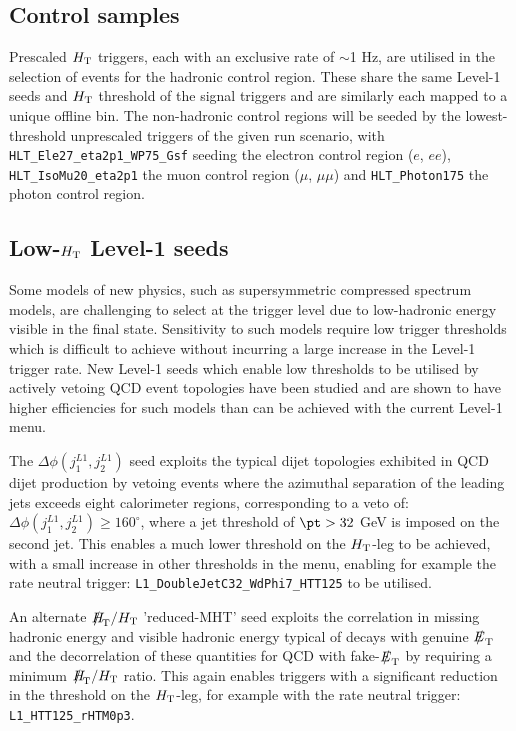\subsection{Control samples}
Prescaled $\mbox{$H_\text{T}$}$ triggers, each with an exclusive rate of $\sim$1 Hz, are utilised in the selection of events for the hadronic control region. These share the same Level-1 seeds and $\mbox{$H_\text{T}$}$ threshold of the signal triggers and are similarly each mapped to a unique offline bin. The non-hadronic control regions will be seeded by the lowest-threshold unprescaled triggers of the given run scenario, with \verb!HLT_Ele27_eta2p1_WP75_Gsf! seeding the electron control region ($e$, $ee$), \verb!HLT_IsoMu20_eta2p1! the muon control region ($\mu$, $\mu\mu$) and \verb!HLT_Photon175! the photon control region.





\subsection{Low-$\mbox{$H_\text{T}$}$ Level-1 seeds}

Some models of new physics, such as supersymmetric compressed spectrum models, are challenging to select at the trigger level due to low-hadronic energy visible in the final state. Sensitivity to such models require low trigger thresholds which is difficult to achieve without incurring a large increase in the Level-1 trigger rate. New Level-1 seeds which enable low thresholds to be utilised by actively vetoing QCD event topologies have been studied and are shown to have higher efficiencies for such models than can be achieved with the current Level-1 menu.

The $\Delta\phi(j_{1}^{L1},j_{2}^{L1})$ seed exploits the typical dijet topologies exhibited in QCD dijet production by vetoing events where the azimuthal separation of the leading jets exceeds eight calorimeter regions, corresponding to a veto of: $\Delta\phi(j_{1}^{L1},j_{2}^{L1}) \ge 160^{\circ}$, where a jet threshold of $\pt > 32$ GeV is imposed on the second jet. This enables a much lower threshold on the $\mbox{$H_\text{T}$}$-leg to be achieved, with a small increase in other thresholds in the menu, enabling for example the rate neutral trigger: \verb!L1_DoubleJetC32_WdPhi7_HTT125! to be utilised.

An alternate $\mht/\scalht$ 'reduced-MHT' seed exploits the correlation in missing hadronic energy and visible hadronic energy typical of decays with genuine $\met$ and the decorrelation of these quantities for QCD with fake-$\met$ by requiring a minimum $\mht/\scalht$ ratio. This again enables triggers with a significant reduction in the threshold on the $\mbox{$H_\text{T}$}$-leg, for example with the rate neutral trigger: \verb!L1_HTT125_rHTM0p3!.

